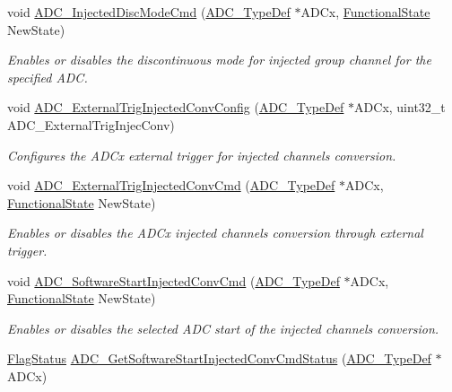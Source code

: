 \begin{DoxyCompactItemize}
void \hyperlink{group___a_d_c___exported___functions_ga0b583b94183fa4ff287177b9ee808092}{A\+D\+C\+\_\+\+Injected\+Disc\+Mode\+Cmd} (\hyperlink{struct_a_d_c___type_def}{A\+D\+C\+\_\+\+Type\+Def} $\ast$A\+D\+Cx, \hyperlink{group___exported__types_gac9a7e9a35d2513ec15c3b537aaa4fba1}{Functional\+State} New\+State)
\begin{DoxyCompactList}\small\item\em Enables or disables the discontinuous mode for injected group channel for the specified A\+DC. \end{DoxyCompactList}\item 
void \hyperlink{group___a_d_c___exported___functions_gafc02ce1e84e96b692adf085f61a0bca6}{A\+D\+C\+\_\+\+External\+Trig\+Injected\+Conv\+Config} (\hyperlink{struct_a_d_c___type_def}{A\+D\+C\+\_\+\+Type\+Def} $\ast$A\+D\+Cx, uint32\+\_\+t A\+D\+C\+\_\+\+External\+Trig\+Injec\+Conv)
\begin{DoxyCompactList}\small\item\em Configures the A\+D\+Cx external trigger for injected channels conversion. \end{DoxyCompactList}\item 
void \hyperlink{group___a_d_c___exported___functions_gad81d134c083d8f407c819e6f4722d553}{A\+D\+C\+\_\+\+External\+Trig\+Injected\+Conv\+Cmd} (\hyperlink{struct_a_d_c___type_def}{A\+D\+C\+\_\+\+Type\+Def} $\ast$A\+D\+Cx, \hyperlink{group___exported__types_gac9a7e9a35d2513ec15c3b537aaa4fba1}{Functional\+State} New\+State)
\begin{DoxyCompactList}\small\item\em Enables or disables the A\+D\+Cx injected channels conversion through external trigger. \end{DoxyCompactList}\item 
void \hyperlink{group___a_d_c___exported___functions_ga5b141d5dbf5f417a11dfa622c8c149d3}{A\+D\+C\+\_\+\+Software\+Start\+Injected\+Conv\+Cmd} (\hyperlink{struct_a_d_c___type_def}{A\+D\+C\+\_\+\+Type\+Def} $\ast$A\+D\+Cx, \hyperlink{group___exported__types_gac9a7e9a35d2513ec15c3b537aaa4fba1}{Functional\+State} New\+State)
\begin{DoxyCompactList}\small\item\em Enables or disables the selected A\+DC start of the injected channels conversion. \end{DoxyCompactList}\item 
\hyperlink{group___exported__types_ga89136caac2e14c55151f527ac02daaff}{Flag\+Status} \hyperlink{group___a_d_c___exported___functions_ga8765f8835b8cfed13dce3d8d71767dcc}{A\+D\+C\+\_\+\+Get\+Software\+Start\+Injected\+Conv\+Cmd\+Status} (\hyperlink{struct_a_d_c___type_def}{A\+D\+C\+\_\+\+Type\+Def} $\ast$A\+D\+Cx)

\end{DoxyCompactItemize}
